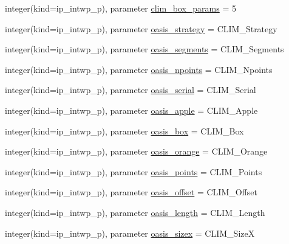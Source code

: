 \begin{DoxyCompactItemize}
\item 
integer(kind=ip\+\_\+intwp\+\_\+p), parameter \hyperlink{namespacemod__oasis__parameters_ad1b7c8ebf0654b72d75292821cf54bc9}{clim\+\_\+box\+\_\+params} = 5
\item 
integer(kind=ip\+\_\+intwp\+\_\+p), parameter \hyperlink{namespacemod__oasis__parameters_aa6a71a0b20dacca6f3263d8619eb9fca}{oasis\+\_\+strategy} = C\+L\+I\+M\+\_\+\+Strategy
\item 
integer(kind=ip\+\_\+intwp\+\_\+p), parameter \hyperlink{namespacemod__oasis__parameters_abea28ab92f0119c9beadce9c1461b88b}{oasis\+\_\+segments} = C\+L\+I\+M\+\_\+\+Segments
\item 
integer(kind=ip\+\_\+intwp\+\_\+p), parameter \hyperlink{namespacemod__oasis__parameters_ac8f73bfed8f7b03f17cd72e7b95b4646}{oasis\+\_\+npoints} = C\+L\+I\+M\+\_\+\+Npoints
\item 
integer(kind=ip\+\_\+intwp\+\_\+p), parameter \hyperlink{namespacemod__oasis__parameters_a6d75932f0d32fb81f74a14ff2236552a}{oasis\+\_\+serial} = C\+L\+I\+M\+\_\+\+Serial
\item 
integer(kind=ip\+\_\+intwp\+\_\+p), parameter \hyperlink{namespacemod__oasis__parameters_a3ea72dd64e62c99227513c14b909b11c}{oasis\+\_\+apple} = C\+L\+I\+M\+\_\+\+Apple
\item 
integer(kind=ip\+\_\+intwp\+\_\+p), parameter \hyperlink{namespacemod__oasis__parameters_aaec8bc9377ee93b6ff19e68dd1c629c1}{oasis\+\_\+box} = C\+L\+I\+M\+\_\+\+Box
\item 
integer(kind=ip\+\_\+intwp\+\_\+p), parameter \hyperlink{namespacemod__oasis__parameters_abb1fb57f8d75a98957e6d3e1c85d0096}{oasis\+\_\+orange} = C\+L\+I\+M\+\_\+\+Orange
\item 
integer(kind=ip\+\_\+intwp\+\_\+p), parameter \hyperlink{namespacemod__oasis__parameters_ac3b3c12b4455e1baab14dd39820586e8}{oasis\+\_\+points} = C\+L\+I\+M\+\_\+\+Points
\item 
integer(kind=ip\+\_\+intwp\+\_\+p), parameter \hyperlink{namespacemod__oasis__parameters_a854ff4345b9a9676b39f7f30233a55d2}{oasis\+\_\+offset} = C\+L\+I\+M\+\_\+\+Offset
\item 
integer(kind=ip\+\_\+intwp\+\_\+p), parameter \hyperlink{namespacemod__oasis__parameters_a631ca32860a10f8134985ad8db4667d2}{oasis\+\_\+length} = C\+L\+I\+M\+\_\+\+Length
\item 
integer(kind=ip\+\_\+intwp\+\_\+p), parameter \hyperlink{namespacemod__oasis__parameters_a58295a6037954bd96e350f0077810529}{oasis\+\_\+sizex} = C\+L\+I\+M\+\_\+\+SizeX
\item 

\end{DoxyCompactItemize}
